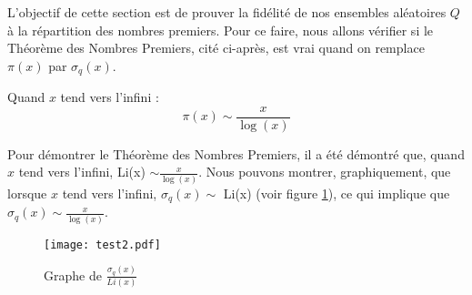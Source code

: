 \documentclass[../main.tex]{report}
\begin{document}
L'objectif de cette section est de prouver la fidélité de nos ensembles aléatoires $Q$ à la répartition des nombres premiers.
Pour ce faire, nous allons vérifier si le Théorème des Nombres Premiers, cité ci-après, est vrai quand on remplace $\pi(x)$ par $\sigma_{q}(x)$. 

\begin{Thm}
\label{TNP}
	Quand $x$ tend vers l'infini : 
	\[ \pi(x) \sim \frac{x}{\log(x)}  \]
\end{Thm}

Pour démontrer le Théorème des Nombres Premiers, il a été démontré que, quand $x$ tend vers l'infini,  Li(x) $\sim \frac{x}{\log(x)} $. Nous pouvons montrer, graphiquement, que lorsque $x$ tend vers l'infini, $ \sigma_{q}(x) \sim $ Li(x) (voir figure \ref{im:image3}), ce qui implique que $ \sigma_{q}(x) \sim \frac{x}{\log(x)} $.

\begin{figure}[H]
\centering
\texttt{[image: test2.pdf]}
\caption{Graphe de $\frac{\sigma_{q}(x)}{Li(x)}$}
\label{im:image3}
\end{figure}
\end{document}

